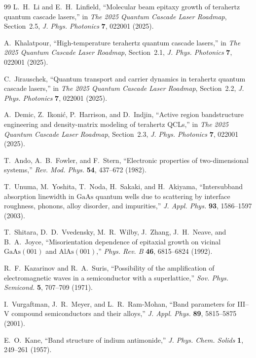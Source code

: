 \documentclass[11pt,letterpaper]{article}
\begin{document}
\begin{thebibliography}{99}
L.~H.~Li and E.~H.~Linfield, ``Molecular beam epitaxy growth of terahertz quantum cascade lasers,'' in \textit{The 2025 Quantum Cascade Laser Roadmap}, Section~2.5, \textit{J. Phys. Photonics} \textbf{7}, 022001 (2025).

A.~Khalatpour, ``High-temperature terahertz quantum cascade lasers,'' in \textit{The 2025 Quantum Cascade Laser Roadmap}, Section~2.1, \textit{J. Phys. Photonics} \textbf{7}, 022001 (2025).

C.~Jirauschek, ``Quantum transport and carrier dynamics in terahertz quantum cascade lasers,'' in \textit{The 2025 Quantum Cascade Laser Roadmap}, Section~2.2, \textit{J. Phys. Photonics} \textbf{7}, 022001 (2025).

A.~Demic, Z.~Ikoni\'c, P.~Harrison, and D.~Indjin, ``Active region bandstructure engineering and density-matrix modeling of terahertz QCLs,'' in \textit{The 2025 Quantum Cascade Laser Roadmap}, Section~2.3, \textit{J. Phys. Photonics} \textbf{7}, 022001 (2025).

T.~Ando, A.~B.~Fowler, and F.~Stern, ``Electronic properties of two-dimensional systems,'' \textit{Rev. Mod. Phys.} \textbf{54}, 437--672 (1982).

T.~Unuma, M.~Yoshita, T.~Noda, H.~Sakaki, and H.~Akiyama, ``Intersubband absorption linewidth in $\mathrm{GaAs}$ quantum wells due to scattering by interface roughness, phonons, alloy disorder, and impurities,'' \textit{J. Appl. Phys.} \textbf{93}, 1586--1597 (2003).

T.~Shitara, D.~D.~Vvedensky, M.~R.~Wilby, J.~Zhang, J.~H.~Neave, and B.~A.~Joyce, ``Misorientation dependence of epitaxial growth on vicinal $\mathrm{GaAs}(001)$ and $\mathrm{AlAs}(001)$,'' \textit{Phys. Rev. B} \textbf{46}, 6815--6824 (1992).

R.~F.~Kazarinov and R.~A.~Suris, ``Possibility of the amplification of electromagnetic waves in a semiconductor with a superlattice,'' \textit{Sov. Phys. Semicond.} \textbf{5}, 707--709 (1971).

I.~Vurgaftman, J.~R.~Meyer, and L.~R.~Ram-Mohan, ``Band parameters for III--V compound semiconductors and their alloys,'' \textit{J. Appl. Phys.} \textbf{89}, 5815--5875 (2001).

E.~O.~Kane, ``Band structure of indium antimonide,'' \textit{J. Phys. Chem. Solids} \textbf{1}, 249--261 (1957).


\end{thebibliography}
\end{document}
